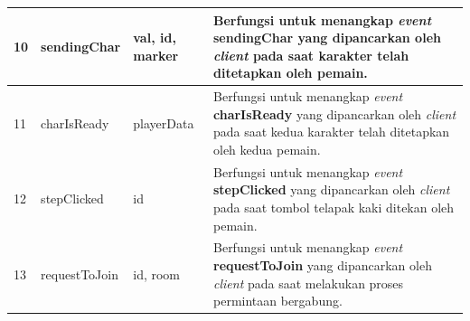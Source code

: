 \begin{enumerate}
\begin{enumerate}
\begin{table}[H]
\begin{tabular}{|p{0.35cm}|p{3cm}|p{3cm}|p{7cm}|}
				10 & sendingChar & val, id, marker & Berfungsi untuk menangkap \textit{event} \textbf{sendingChar} yang dipancarkan oleh \textit{client} pada saat karakter telah ditetapkan oleh pemain. \\ \hline
				11 & charIsReady & playerData & Berfungsi untuk menangkap \textit{event} \textbf{charIsReady} yang dipancarkan oleh \textit{client} pada saat kedua karakter telah ditetapkan oleh kedua pemain. \\ \hline
				12 & stepClicked & id & Berfungsi untuk menangkap \textit{event} \textbf{stepClicked} yang dipancarkan oleh \textit{client} pada saat tombol telapak kaki ditekan oleh pemain. \\ \hline
				13 & requestToJoin & id, room & Berfungsi untuk menangkap \textit{event} \textbf{requestToJoin} yang dipancarkan oleh \textit{client} pada saat melakukan proses permintaan bergabung. \\ \hline
			\end{tabular}
			\label{table:event_www}
		\end{table}
		

\end{enumerate}
\end{enumerate}
